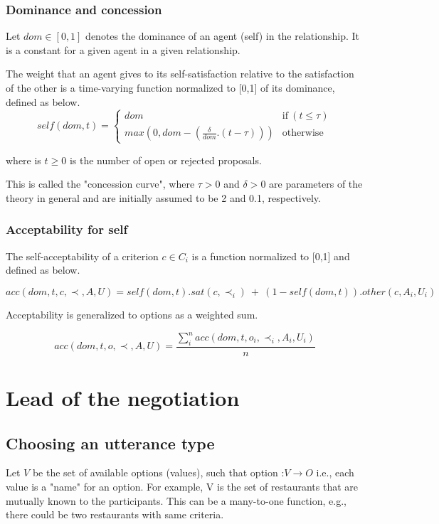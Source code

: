 \documentclass{article}
\begin{document}
	\subsubsection{Dominance and concession}
	Let  $dom \in [0, 1] $ denotes the dominance of an agent (self) in the 	relationship.  It is a constant for a given agent in a given relationship.
	
	The weight that an agent gives to its self-satisfaction relative to	the satisfaction of the other is a time-varying function normalized to 	[0,1] of its dominance, defined as below.
		$$self(dom, t) = \left\{\begin{array}{ll}
		dom & \mathrm{if\ } (t \leq \tau)\\
		max(0, dom - (\frac{\delta}{dom} . (t - \tau))) & \mathrm{otherwise}
		\end{array}\right.$$
		
	
	where is $t \geq 0$ is the number of open or rejected proposals.
	
	This is called the "concession curve", where $\tau > 0$ and $\delta > 0$
	are parameters of the theory in general and are initially assumed to
	be 2 and 0.1, respectively.
	\subsubsection{Acceptability for self}

	The self-acceptability of a criterion $c \in C_i$ is a function	normalized to [0,1] and defined as below.
	
	$$acc(dom, t, c, \prec, A, U) = self(dom, t) . sat(c, \prec_i) \ +\  (1 - self(dom, t)) . other(c, A_i, U_i)$$
	
	Acceptability is generalized to options as a weighted sum.
	
	$$acc(dom, t, o, \prec, A, U) = \frac{ \sum_{i}^{n} acc(dom, t, o_i, \prec_i, A_i, U_i) } {n}$$ 
	
	
	\section{Lead of the negotiation}

	
	\subsection{Choosing an utterance type}
		Let $V$ be the set of available options (values), such that option :$ V\rightarrow O$	i.e., each value is a "name" for an option.  For example, V is the set of restaurants that are mutually known to the participants. This can be a many-to-one function, e.g., there could be two restaurants with same criteria.		
		
\end{document}
